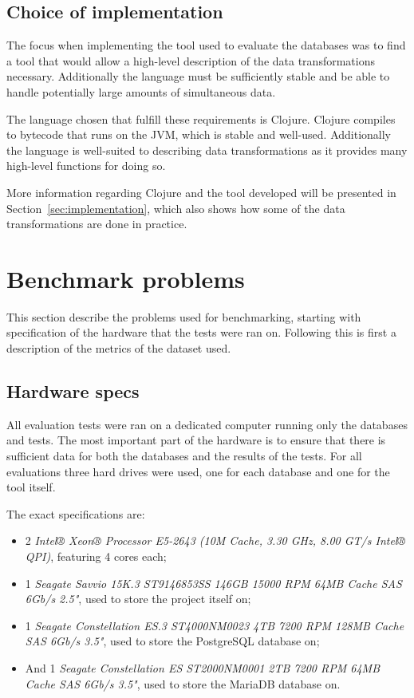 \subsection{Choice of implementation}\label{sec:implchoice}
The focus when implementing the tool used to evaluate the databases was to find
a tool that would allow a high-level description of the data transformations
necessary. Additionally the language must be sufficiently stable and be able to
handle potentially large amounts of simultaneous data.

The language chosen that fulfill these requirements is Clojure. Clojure compiles
to bytecode that runs on the JVM, which is stable and well-used. Additionally
the language is well-suited to describing data transformations as it provides
many high-level functions for doing so.

More information regarding Clojure and the tool developed will be presented in
Section~\ref{sec:implementation}, which also shows how some of the data
transformations are done in practice.

\section{Benchmark problems}\label{sec:benchmark}
This section describe the problems used for benchmarking, starting with
specification of the hardware that the tests were ran on. Following this is
first a description of the metrics of the dataset used.

\subsection{Hardware specs}
All evaluation tests were ran on a dedicated computer running only the databases
and tests. The most important part of the hardware is to ensure that there is
sufficient data for both the databases and the results of the tests. For all
evaluations three hard drives were used, one for each database and one for the
tool itself.

The exact specifications are:
\begin{itemize}
\item 2 \textit{Intel® Xeon® Processor E5-2643 (10M Cache, 3.30 GHz, 8.00 GT/s Intel®
    QPI)}, featuring 4 cores each;
\item 1 \textit{Seagate Savvio 15K.3 ST9146853SS 146GB 15000 RPM 64MB Cache SAS 6Gb/s
    2.5"}, used to store the project itself on;
\item 1 \textit{Seagate Constellation ES.3 ST4000NM0023 4TB 7200 RPM 128MB Cache SAS
    6Gb/s 3.5"}, used to store the PostgreSQL database on;
\item And 1 \textit{Seagate Constellation ES ST2000NM0001 2TB 7200 RPM 64MB Cache SAS 6Gb/s
    3.5"}, used to store the MariaDB database on.
\end{itemize}

